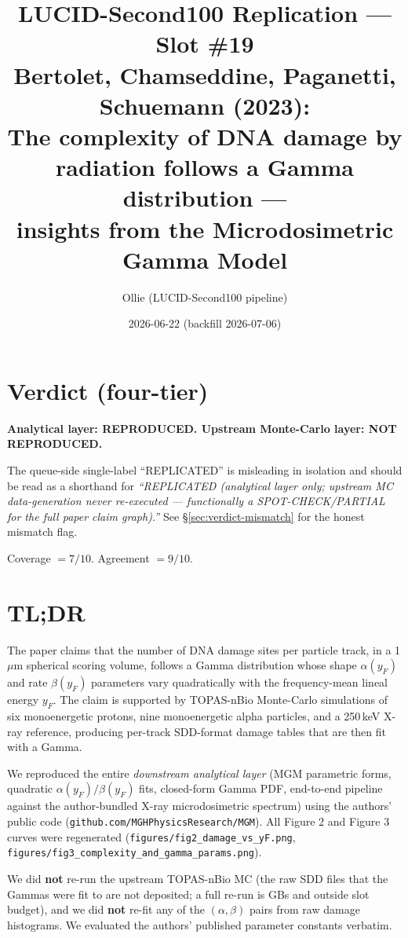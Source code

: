 \documentclass[11pt]{article}
\title{LUCID-Second100 Replication --- Slot \#19\\
\large Bertolet, Chamseddine, Paganetti, Schuemann (2023):\\
The complexity of DNA damage by radiation follows a Gamma distribution ---\\
insights from the Microdosimetric Gamma Model}
\author{Ollie (LUCID-Second100 pipeline)}
\date{2026-06-22 (backfill 2026-07-06)}
\begin{document}
\maketitle

\section*{Verdict (four-tier)}

\textbf{Analytical layer: REPRODUCED. Upstream Monte-Carlo layer: NOT REPRODUCED.}

The queue-side single-label ``REPLICATED'' is misleading in isolation and should be
read as a shorthand for \emph{``REPLICATED (analytical layer only; upstream MC data-generation
never re-executed --- functionally a SPOT-CHECK/PARTIAL for the full paper claim graph).''}
See \S\ref{sec:verdict-mismatch} for the honest mismatch flag.

Coverage $= 7/10$. Agreement $= 9/10$.

\section{TL;DR}

The paper claims that the number of DNA damage sites per particle track, in a
1\,$\mu$m spherical scoring volume, follows a Gamma distribution whose shape
$\alpha(y_F)$ and rate $\beta(y_F)$ parameters vary quadratically with the
frequency-mean lineal energy $y_F$. The claim is supported by TOPAS-nBio
Monte-Carlo simulations of six monoenergetic protons, nine monoenergetic alpha
particles, and a 250\,keV X-ray reference, producing per-track SDD-format
damage tables that are then fit with a Gamma.

We reproduced the entire \emph{downstream analytical layer} (MGM parametric forms,
quadratic $\alpha(y_F)/\beta(y_F)$ fits, closed-form Gamma PDF, end-to-end
pipeline against the author-bundled X-ray microdosimetric spectrum) using the
authors' public code (\texttt{github.com/MGHPhysicsResearch/MGM}). All Figure 2 and
Figure 3 curves were regenerated (\texttt{figures/fig2\_damage\_vs\_yF.png},
\texttt{figures/fig3\_complexity\_and\_gamma\_params.png}).

We did \textbf{not} re-run the upstream TOPAS-nBio MC (the raw SDD files that the
Gammas were fit to are not deposited; a full re-run is GBs and outside slot
budget), and we did \textbf{not} re-fit any of the $(\alpha, \beta)$ pairs from raw
damage histograms. We evaluated the authors' published parameter constants
verbatim.
\end{document}
